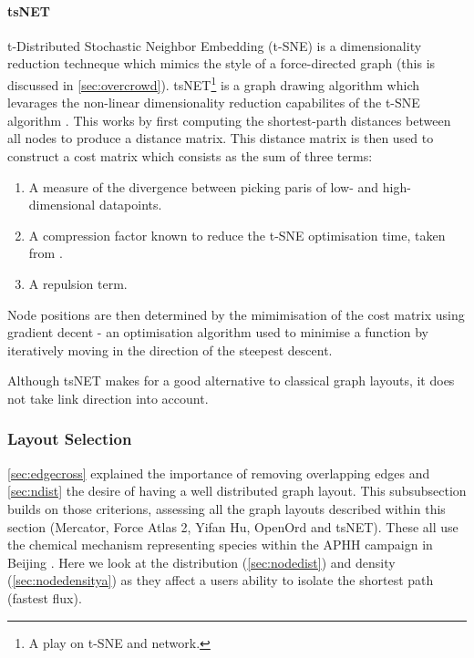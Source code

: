 \paragraph{tsNET}
t-Distributed Stochastic Neighbor Embedding (t-SNE) is a dimensionality reduction techneque which mimics the style of a force-directed graph (this is discussed in \autoref{sec:overcrowd}). tsNET\footnote{A play on t-SNE and network.} is a graph drawing algorithm which levarages the non-linear dimensionality reduction capabilites of the t-SNE algorithm \citep{tsne}. This works by first computing the shortest-parth distances between all nodes to produce a distance matrix. This distance matrix is then used to construct a cost matrix which consists as the sum of three terms:

\begin{enumerate}
    \item A measure of the divergence between picking paris of low- and high-dimensional datapoints.
    \item A compression factor known to reduce the t-SNE optimisation time, taken from \citep{tsnetcompression}.
    \item A repulsion term. 
\end{enumerate}
    
Node positions are then determined by the mimimisation of the cost matrix using gradient decent - an optimisation algorithm used to minimise a function by iteratively moving in the direction of the steepest descent. 

Although tsNET makes for a good alternative to classical graph layouts, it does not take link direction into account. 



\subsubsection{Layout Selection}

\autoref{sec:edgecross} explained the importance of removing overlapping edges and \autoref{sec:ndist} the desire of having a well distributed graph layout. This subsubsection builds on those criterions, assessing all the graph layouts described within this section (Mercator, Force Atlas 2, Yifan Hu, OpenOrd and tsNET). These all use the chemical mechanism representing species within the APHH campaign in Beijing \citep{aphh}. Here we look at the distribution (\autoref{sec:nodedist}) and density (\autoref{sec:nodedensitya}) as they affect a users ability to isolate the shortest path (fastest flux).

